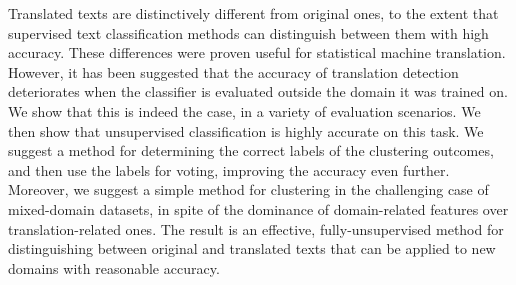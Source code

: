 Translated texts are distinctively different from original ones, to the extent that supervised text classification methods can distinguish between them with high accuracy. These differences were proven useful for statistical machine translation. However, it has been suggested that the accuracy of translation detection deteriorates when the classifier is evaluated outside the domain it was trained on. We show that this is indeed the case, in a variety of evaluation scenarios. We then show that unsupervised classification is highly accurate on this task. We suggest a method for determining the correct labels of the clustering outcomes, and then use the labels for voting, improving the accuracy even further. Moreover, we suggest a simple method for clustering in the challenging case of mixed-domain datasets, in spite of the dominance of domain-related features over translation-related ones. The result is an effective, fully-unsupervised method for distinguishing between original and translated texts that can be applied to new domains with reasonable accuracy.
